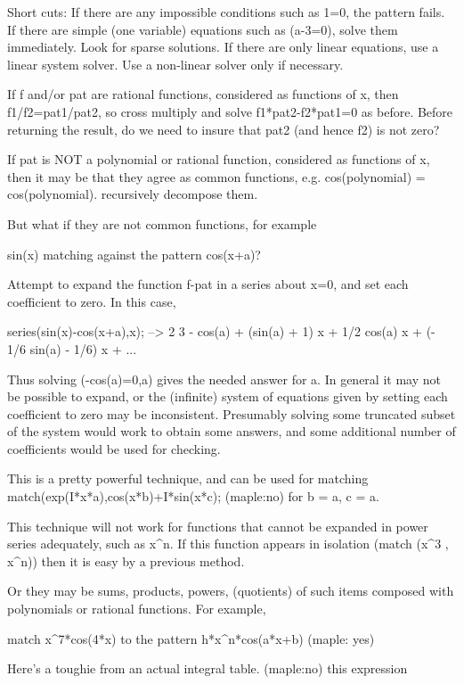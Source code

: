 Short cuts:  If there are any impossible conditions such as 1=0,
the pattern fails. If there are simple (one variable) equations
such as (a-3=0), solve them immediately.
Look for sparse solutions.
If there are only linear equations, use a linear system solver.
Use a non-linear solver only if necessary.

If f and/or pat are rational functions, considered as functions of
x, then f1/f2=pat1/pat2, so cross multiply and solve f1*pat2-f2*pat1=0
as before.  Before returning the result, do we need to insure that 
pat2 (and hence f2) is not zero?

If pat is NOT a polynomial or rational function, considered
as functions of x, then it may be that they agree as common functions,
e.g. cos(polynomial) = cos(polynomial).  recursively decompose them.

But what if they are not common functions, for example

sin(x) matching against the pattern cos(x+a)?


Attempt to expand the function f-pat  in a series about x=0, and
set each coefficient to zero.  In this case,

series(sin(x)-cos(x+a),x); -->
                                              2                         3
      - cos(a) + (sin(a) + 1) x + 1/2 cos(a) x  + (- 1/6 sin(a) - 1/6) x + ...

Thus solving (-cos(a)=0,a) gives the needed answer for a.  In general
it may not be possible to expand, or the (infinite) system of
equations given by setting each coefficient to zero may be inconsistent.
Presumably solving some truncated subset of the system would work to obtain
some answers, and some additional number of coefficients would be used
for checking.

This is a pretty powerful technique, and can be used for matching
match(exp(I*x*a),cos(x*b)+I*sin(x*c);  (maple:no)
for {b = a, c = a}.

This technique will not work for functions that cannot be expanded
in power series adequately, such as x^n.  If this function appears
in isolation (match (x^3 , x^n)) then it  is easy by a previous method.

Or they may be sums, products, powers, (quotients) of such items
composed with polynomials or rational functions.  For example,

match x^7*cos(4*x) to the pattern h*x^n*cos(a*x+b)  (maple: yes)

Here's a toughie from an actual integral table. (maple:no) this expression

